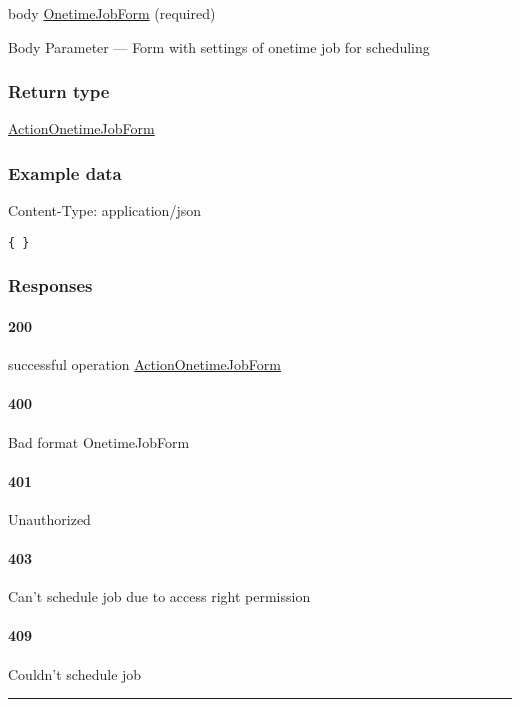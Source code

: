 body \protect\hyperlink{OnetimeJobForm}{OnetimeJobForm} (required)

{Body Parameter} --- Form with settings of onetime job for scheduling

\hypertarget{return-type-10}{%
\subsubsection*{Return type}\label{return-type-10}}

\protect\hyperlink{ActionOnetimeJobForm}{ActionOnetimeJobForm}

\hypertarget{example-data-10}{%
\subsubsection*{Example data}\label{example-data-10}}

Content-Type: application/json

\begin{verbatim}
{ }
\end{verbatim}

\hypertarget{responses-10}{%
\subsubsection*{Responses}\label{responses-10}}

\hypertarget{section-35}{%
\paragraph{200}\label{section-35}}

successful operation
\protect\hyperlink{ActionOnetimeJobForm}{ActionOnetimeJobForm}

\hypertarget{section-36}{%
\paragraph{400}\label{section-36}}

Bad format OnetimeJobForm \protect\hyperlink{}{}

\hypertarget{section-37}{%
\paragraph{401}\label{section-37}}

Unauthorized \protect\hyperlink{}{}

\hypertarget{section-38}{%
\paragraph{403}\label{section-38}}

Can't schedule job due to access right permission \protect\hyperlink{}{}

\hypertarget{section-39}{%
\paragraph{409}\label{section-39}}

Couldn't schedule job \protect\hyperlink{}{}

\begin{center}\rule{0.5\linewidth}{0.5pt}\end{center}
